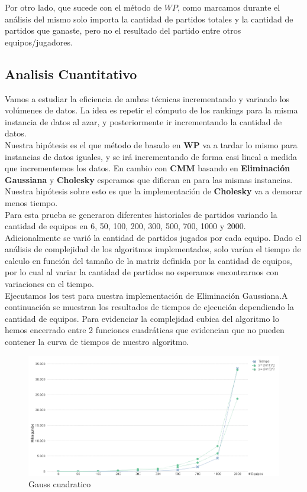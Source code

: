 Por otro lado, que sucede con el método de $WP$, como marcamos durante el análisis del mismo solo importa la cantidad de partidos totales y la cantidad de partidos que ganaste, pero no el resultado del partido entre otros equipos/jugadores.

\subsection{Analisis Cuantitativo}


Vamos a estudiar la eficiencia de ambas técnicas incrementando y variando los volúmenes de datos. La idea es repetir el cómputo de los rankings para la misma instancia de datos al azar, 
y posteriormente ir incrementando la cantidad de datos. \\

Nuestra hipótesis es el que método de basado en \textbf{WP} va a tardar lo mismo para instancias de datos iguales, y se irá incrementando de forma casi lineal a medida que 
incrementemos los datos. En cambio con \textbf{CMM} basando en \textbf{Eliminación Gaussiana} y \textbf{Cholesky} esperamos que difieran en para las mismas instancias. 
Nuestra hipótesis sobre esto es que la implementación de \textbf{Cholesky} va a demorar menos tiempo. \\

Para esta prueba se generaron diferentes historiales de partidos variando la cantidad de equipos en 6, 50, 100, 200, 300, 500, 700, 1000 y 2000. \\

Adicionalmente se varió la cantidad de partidos jugados por cada equipo. Dado el análisis de complejidad de los algoritmos implementados, solo varían el tiempo de calculo en 
función del tamaño de la matriz definida por la cantidad de equipos, por lo cual al variar la cantidad de partidos no esperamos encontrarnos con variaciones en el tiempo. \\

Ejecutamos los test para nuestra implementación de Eliminación Gaussiana.A continuación se muestran los resultados de tiempos de ejecución dependiendo la cantidad de equipos.
Para evidenciar la complejidad cubica del algoritmo lo hemos encerrado entre 2 funciones cuadráticas que evidencian que no pueden contener la curva de tiempos de nuestro algoritmo. \\

\begin{figure}[H]
\centering
\includegraphics[width=1\textwidth]{IMG/gauss cuadrativo.png}
\caption{Gauss cuadratico}
\label{fig:Gauss cuadratico}
\end{figure}

